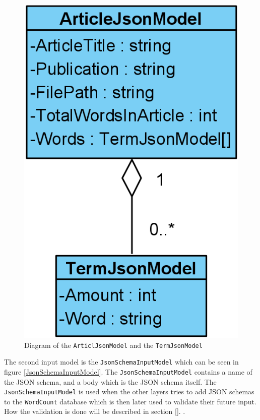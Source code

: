 \begin{figure}[H]
    \centering
    \includegraphics[scale=0.5]{Images/jsonArticleModel.PNG}
    \caption{Diagram of the \texttt{ArticlJsonModel} and the \texttt{TermJsonModel}}
    \label{ArticlJsonModel}
\end{figure}

The second input model is the \texttt{JsonSchemaInputModel} which can be seen in figure \ref*{JsonSchemaInputModel}. The \texttt{JsonSchemaInputModel} contains a name of the JSON schema, and a body which is the JSON schema itself. 
The \texttt{JsonSchemaInputModel} is used when the other layers tries to add JSON schemas to the \texttt{WordCount} database which is then later used to validate their future input. 
How the validation is done will be described in section \ref*{}. .

